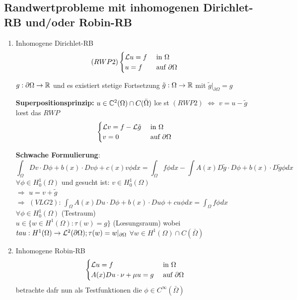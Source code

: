 \subsection{Randwertprobleme mit inhomogenen Dirichlet-RB und/oder Robin-RB}
\begin{enumerate}
  \item Inhomogene Dirichlet-RB\\
    \[
      (RWP2)\begin{cases}
      \mathcal{L} u=f & \mbox{ in }\Omega\\
      u=f & \mbox{ auf }\partial\Omega
      \end{cases}
    \]

    $g:\partial\Omega \rightarrow \mathbb{R}$ und es existiert stetige Fortsetzung
    $\tilde g:\Omega\rightarrow \mathbb{R}$ mit $\tilde g|_{\partial\Omega}=g$

    \textbf{Superpositionsprinzip:} $u\in\mathbb{C}^2(\Omega)\cap C(\bar\Omega)$ l\oe
    st $(RWP2)$ $\Leftrightarrow$
    $v=u-\tilde g$ l\oe st das $RWP$
    \[
      \begin{cases}
      \mathcal{L} v=f-\mathcal{L}\tilde g & \mbox{ in }\Omega\\
      v=0 & \mbox{ auf }\partial\Omega
      \end{cases}
    \]

    \textbf{Schwache Formulierung}:
    \[
      \int_\Omega Dv\cdot D\phi+b(x)\cdot Dv\phi +c(x)v\phi dx =\int_\Omega
      f\phi dx - \int A(x)D\tilde g \cdot D\phi + b(x)\cdot D\tilde g \phi dx
    \]
    $\forall \phi \in H^1_0(\Omega)$ und gesucht ist: $v\in H^1_0(\Omega)$\\
    $\Rightarrow$ $u=v+\tilde g$\\
    $\Rightarrow$ $(VLG 2)$: $\int_\Omega A(x)Du\cdot D\phi+b(x)\cdot Du \phi+
    cu\phi dx = \int_\Omega f\phi dx$ $\forall \phi\in H^1_0(\Omega)$
    (Testraum)\\
    $u\in \{ w\in H^1(\Omega) : \tau(w)=g \}$ (L\oe sungsraum) wobei
    $tau:H^1(\Omega)\rightarrow \mathcal{L}^2(\partial\Omega);
    \tau(w)=w|_{\partial\Omega}$ $\forall w\in H^1(\Omega)\cap C(\bar \Omega)$
  \item Inhomogene Robin-RB\\
    \[
      \begin{cases}
      \mathcal{L} u=f & \mbox{ in }\Omega\\
        A(x)Du\cdot \nu+\mu u=g & \mbox{ auf }\partial\Omega
      \end{cases}
    \]
    betrachte daf\ue r nun als Testfunktionen die $\phi\in C^\infty(\bar\Omega)$

\end{enumerate}

